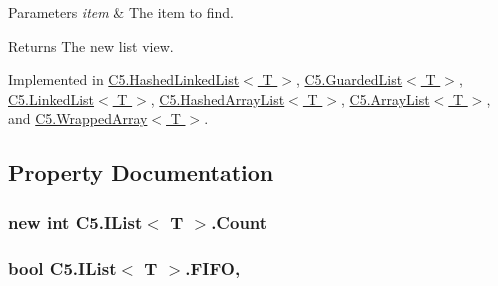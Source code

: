 \begin{DoxyParams}{Parameters}
{\em item} & The item to find.\\
\hline
\end{DoxyParams}
\begin{DoxyReturn}{Returns}
The new list view.
\end{DoxyReturn}


Implemented in \hyperlink{class_c5_1_1_hashed_linked_list_a7ef47c4c75f39782f7f846dadf892f20}{C5.\+Hashed\+Linked\+List$<$ T $>$}, \hyperlink{class_c5_1_1_guarded_list_a62921460eae17301a85a077aa26e98e3}{C5.\+Guarded\+List$<$ T $>$}, \hyperlink{class_c5_1_1_linked_list_a419c2c0089d95d73460431f41e60daa9}{C5.\+Linked\+List$<$ T $>$}, \hyperlink{class_c5_1_1_hashed_array_list_a3649fd58cf5e15c2ef488d61140895fd}{C5.\+Hashed\+Array\+List$<$ T $>$}, \hyperlink{class_c5_1_1_array_list_ae51aa95d71cfbf4ac68610d6285a308e}{C5.\+Array\+List$<$ T $>$}, and \hyperlink{class_c5_1_1_wrapped_array_a819a47c4c0f0ee0397c337e340f86ea1}{C5.\+Wrapped\+Array$<$ T $>$}.



\subsection{Property Documentation}
\hypertarget{interface_c5_1_1_i_list_a91519e08da04aef3233a65779f1b9942}{}
\subsubsection[{Count}]{\setlength{\rightskip}{0pt plus 5cm}new int {\bf C5.\+I\+List}$<$ T $>$.Count\hspace{0.3cm}{\ttfamily [get]}}\label{interface_c5_1_1_i_list_a91519e08da04aef3233a65779f1b9942}




\hypertarget{interface_c5_1_1_i_list_a0c804cfc13feed69e308ca37a32c872d}{}
\subsubsection[{F\+I\+F\+O}]{\setlength{\rightskip}{0pt plus 5cm}bool {\bf C5.\+I\+List}$<$ T $>$.F\+I\+F\+O\hspace{0.3cm}{\ttfamily [get]}, {\ttfamily [set]}}\label{interface_c5_1_1_i_list_a0c804cfc13feed69e308ca37a32c872d}


